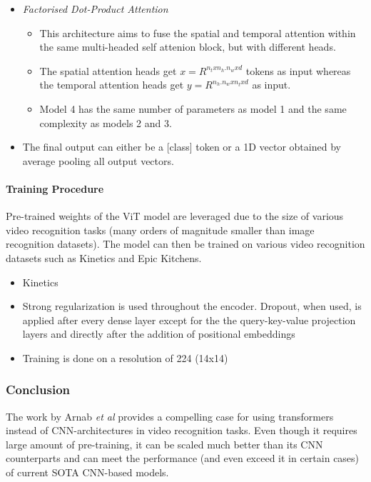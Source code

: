 \begin{itemize}
\begin{itemize}
    \end{itemize}
    \item \textit{Factorised Dot-Product Attention}
    \begin{itemize}
        \item This architecture aims to fuse the spatial and temporal attention within the same multi-headed self attenion block, but with different heads.
        \item The spatial attention heads get $x = R^{n_txn_h.n_wxd}$ tokens as input whereas the temporal attention heads get $y = R^{n_h.n_wxn_txd}$ as input.
        \item Model 4 has the same number of parameters as model 1 and the same complexity as models 2 and 3.
    \end{itemize}
    \item The final output can either be a [class] token or a 1D vector obtained by average pooling all output vectors.
\end{itemize}



\paragraph{Training Procedure}
\par Pre-trained weights of the ViT model are leveraged due to the size of various video recognition tasks (many orders of magnitude smaller than image recognition datasets).
The model can then be trained on various video recognition datasets such as Kinetics and Epic Kitchens.
\begin{itemize}
	\item Kinetics 
	\item Strong regularization is used throughout the encoder. Dropout, when used, is applied after every dense layer except for the the query-key-value projection layers and directly after the addition of positional embeddings
	\item Training is done on a resolution of 224 (14x14)
\end{itemize}

\subsubsection{Conclusion}
\par The work by Arnab \textit{et al} provides a compelling case for using transformers instead of CNN-architectures in video recognition tasks. 
Even though it requires large amount of pre-training, it can be scaled much better than its CNN counterparts and can meet the performance (and even exceed it in certain cases) of current SOTA CNN-based models.
